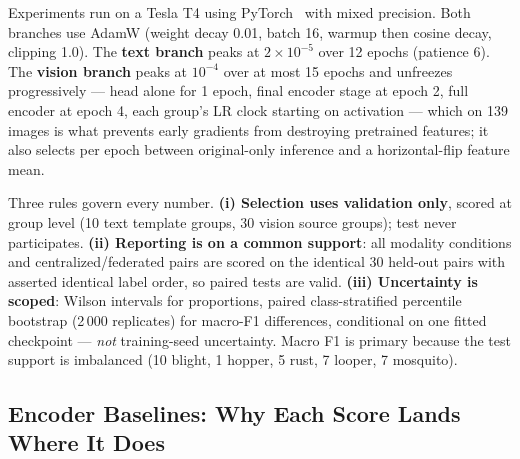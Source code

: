 \documentclass[conference]{IEEEtran}
\begin{document}
Experiments run on a Tesla T4 using PyTorch~\cite{Paszke2019} with mixed
precision. Both branches use AdamW (weight decay 0.01, batch 16, warmup then
cosine decay, clipping 1.0). The \textbf{text branch} peaks at $2\times10^{-5}$
over 12 epochs (patience 6). The \textbf{vision branch} peaks at $10^{-4}$ over
at most 15 epochs and unfreezes progressively --- head alone for 1 epoch, final
encoder stage at epoch 2, full encoder at epoch 4, each group's LR clock starting
on activation --- which on 139 images is what prevents early gradients from
destroying pretrained features; it also selects per epoch between original-only
inference and a horizontal-flip feature mean.

Three rules govern every number. \textbf{(i) Selection uses validation only},
scored at group level (10 text template groups, 30 vision source groups); test
never participates. \textbf{(ii) Reporting is on a common support}: all modality
conditions and centralized/federated pairs are scored on the identical 30
held-out pairs with asserted identical label order, so paired tests are valid.
\textbf{(iii) Uncertainty is scoped}: Wilson intervals for proportions, paired
class-stratified percentile bootstrap (2\,000 replicates) for macro-F1
differences, conditional on one fitted checkpoint --- \emph{not} training-seed
uncertainty. Macro F1 is primary because the test support is imbalanced (10
blight, 1 hopper, 5 rust, 7 looper, 7 mosquito).

\subsection{Encoder Baselines: Why Each Score Lands Where It Does}
\label{sec:encoders}
\end{document}
